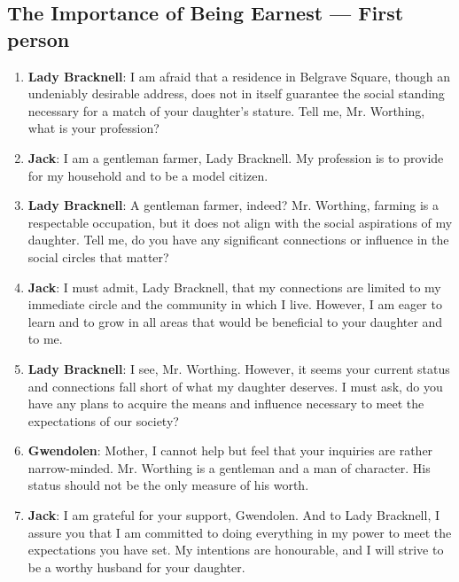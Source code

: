 \documentclass[10pt]{article}
\begin{document}
\subsection*{The Importance of Being Earnest --- First person}

\begin{enumerate}\setlength{\itemsep}{1pt}\small

\item \textbf{Lady Bracknell}: I am afraid that a residence in Belgrave Square, though an undeniably desirable address, does not in itself guarantee the social standing necessary for a match of your daughter's stature. Tell me, Mr. Worthing, what is your profession?

\item \textbf{Jack}: I am a gentleman farmer, Lady Bracknell. My profession is to provide for my household and to be a model citizen.

\item \textbf{Lady Bracknell}: A gentleman farmer, indeed? Mr. Worthing, farming is a respectable occupation, but it does not align with the social aspirations of my daughter. Tell me, do you have any significant connections or influence in the social circles that matter?

\item \textbf{Jack}: I must admit, Lady Bracknell, that my connections are limited to my immediate circle and the community in which I live. However, I am eager to learn and to grow in all areas that would be beneficial to your daughter and to me.

\item \textbf{Lady Bracknell}: I see, Mr. Worthing. However, it seems your current status and connections fall short of what my daughter deserves. I must ask, do you have any plans to acquire the means and influence necessary to meet the expectations of our society?

\item \textbf{Gwendolen}: Mother, I cannot help but feel that your inquiries are rather narrow-minded. Mr. Worthing is a gentleman and a man of character. His status should not be the only measure of his worth.

\item \textbf{Jack}: I am grateful for your support, Gwendolen. And to Lady Bracknell, I assure you that I am committed to doing everything in my power to meet the expectations you have set. My intentions are honourable, and I will strive to be a worthy husband for your daughter.


\end{enumerate}
\end{document}
